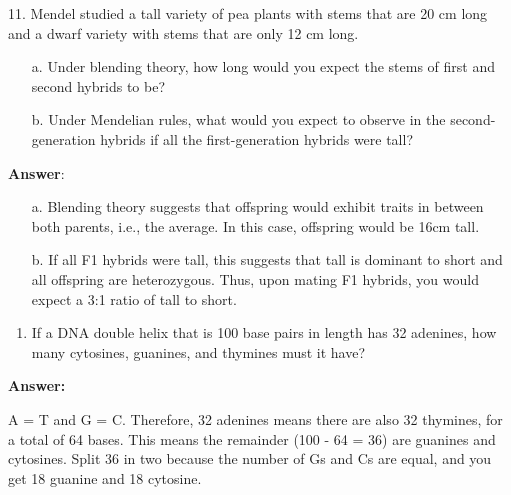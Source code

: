 \documentclass[11pt,]{article}
\providecommand{\tightlist}{%
  \setlength{\itemsep}{0pt}\setlength{\parskip}{0pt}}
\begin{document}
\begin{blackbox}

11. Mendel studied a tall variety of pea plants with stems that are 20 cm long and a dwarf variety with stems that are only 12 cm long. \begin{enumerate} 
 \item[a.]{ Under blending theory, how long would you expect the stems of first and second hybrids to be? } 
 \item[b.]{ Under Mendelian rules, what would you expect to observe in the second-generation hybrids if all the first-generation hybrids were tall? } 
 \end{enumerate}

\vspace{10mm}

\textbf{Answer}: 
\begin{enumerate} 
 \item[a.]{ Blending theory suggests that offspring would exhibit traits in between both parents, i.e., the average. In this case, offspring would be 16cm tall. } 
 \item[b.]{ If all F1 hybrids were tall, this suggests that tall is dominant to short and all offspring are heterozygous. Thus, upon mating F1 hybrids, you would expect a 3:1 ratio of tall to short. } 
 \end{enumerate}

\end{blackbox}

\begin{blackbox}

\begin{enumerate}
\def\labelenumi{\arabic{enumi}.}
\setcounter{enumi}{11}
\tightlist
\item
  If a DNA double helix that is 100 base pairs in length has 32
  adenines, how many cytosines, guanines, and thymines must it have?
\end{enumerate}

\vspace{10mm}

\textbf{Answer:}

A = T and G = C. Therefore, 32 adenines means there are also 32
thymines, for a total of 64 bases. This means the remainder (100 - 64 =
36) are guanines and cytosines. Split 36 in two because the number of Gs
and Cs are equal, and you get 18 guanine and 18 cytosine.

\end{blackbox}
\end{document}
